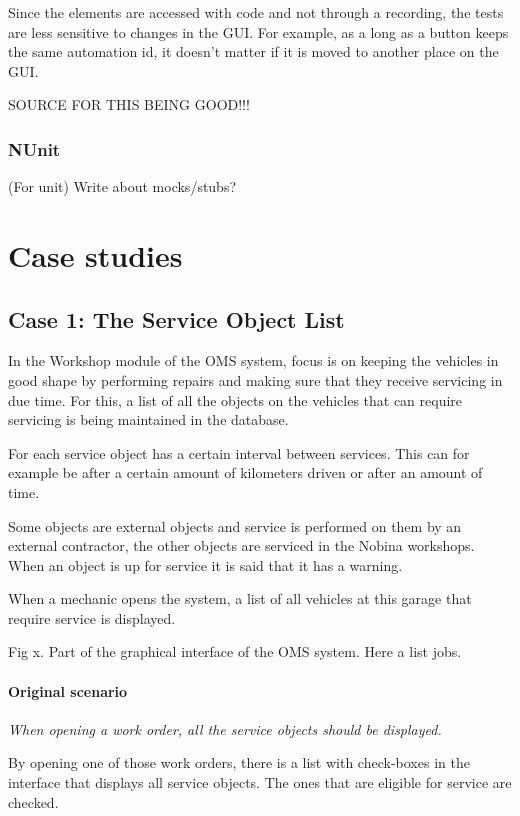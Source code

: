 \documentclass{article}
\begin{document}
			Since the elements are accessed with code and not through a recording, the tests are less sensitive to changes in the GUI. For example, as a long as a button keeps the same automation id, it doesn't matter if it is moved to another place on the GUI. 

			SOURCE FOR THIS BEING GOOD!!!


			\subsubsection{NUnit}
			(For unit)
			Write about mocks/stubs?

	\section{Case studies}
		\subsection{Case 1: The Service Object List}
		In the Workshop module of the OMS system, focus is on keeping the vehicles in good shape by performing repairs and making sure that they receive servicing in due time. For this, a list of all the objects on the vehicles that can require servicing is being maintained in the database. 

		For each service object has a certain interval between services. This can for example be after a certain amount of kilometers driven or after an amount of time. 

		Some objects are external objects and service is performed on them by an external contractor, the other objects are serviced in the Nobina workshops. When an object is up for service it is said that it has a warning.

		When a mechanic opens the system, a list of all vehicles at this garage that require service is displayed.

		Fig x. Part of the graphical interface of the OMS system. Here a list jobs.

			\paragraph{Original scenario}
			{\em When opening a work order, all the service objects should be displayed.}

			By opening one of those work orders, there is a list with check-boxes in the interface that displays all service objects. The ones that are eligible for service are checked.
\end{document}
